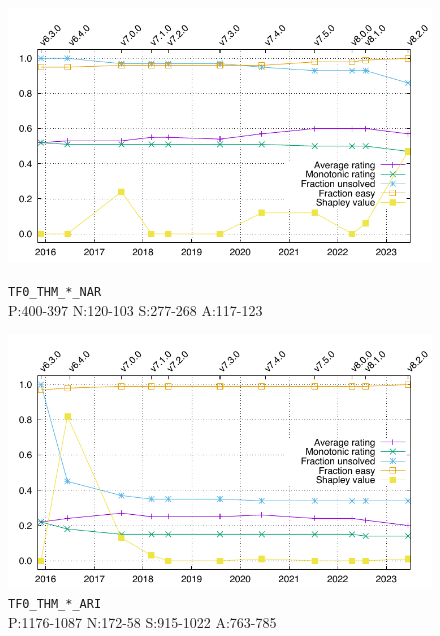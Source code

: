 \documentclass[runningheads]{llncs}
\begin{document}
\begin{figure}[t!]
\centering
\begin{minipage}[t]{.49\textwidth}
  \centering
  \includegraphics[width=\textwidth]{Plots/GNUPlots/TF0_THM_NAR.pdf}
  \vspace*{-2em}
  \caption{{\tt TF0\_THM\_*\_NAR} \\
           {\scriptsize P:400-397 N:120-103 S:277-268 A:117-123}}
  \label{Plot_TF0_THM_NAR}
\end{minipage}
\begin{minipage}[t]{.49\textwidth}
  \centering
  \includegraphics[width=\textwidth]{Plots/GNUPlots/TF0_THM_ARI.pdf}
  \vspace*{-2em}
  \caption{{\tt TF0\_THM\_*\_ARI} \\
           {\scriptsize P:1176-1087 N:172-58 S:915-1022 A:763-785}}
  \label{Plot_TF0_THM_ARI}
\end{minipage}
\begin{minipage}[t]{.49\textwidth}

\end{minipage}
\end{figure}
\end{document}
